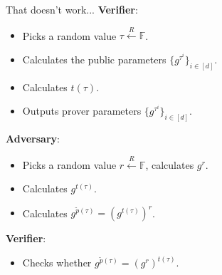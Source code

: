 \documentclass{zkdl-presentation-template}
\begin{document}
    \begin{frame}{That doesn't work...}
        \textbf{Verifier}: 
        \vspace{-5pt}
        \begin{itemize}[label=]
            \item \vspace{-3pt} Picks a random value $\tau \xleftarrow{R} \mathbb{F}$. \pause
            \item \vspace{-3pt} Calculates the public parameters $\{g^{\tau^i}\}_{i \in [d]}$. \pause
            \item \vspace{-3pt} Calculates $t(\tau)$. \pause
            \item \vspace{-3pt} Outputs prover parameters $\{g^{\tau^i}\}_{i \in [d]}$. \pause
        \end{itemize}
        \textbf{Adversary}: 
        \vspace{-5pt}
        \begin{itemize}[label=]
            \item \vspace{-3pt} Picks a random value $r \xleftarrow{R} \mathbb{F}$, calculates $g^r$. \pause
            \item \vspace{-3pt} Calculates $g^{t(\tau)}$. \pause
            \item \vspace{-3pt} Calculates $g^{\widetilde{p}(\tau)} = {\left( g^{t(\tau)} \right)}^r$. \pause
        \end{itemize}
        \textbf{Verifier}: 
        \vspace{-5pt}
        \begin{itemize}[label=]
            \item \vspace{-3pt} Checks whether $g^{\widetilde{p}(\tau)} = \left( g^{r} \right)^{t(\tau)}$.
        \end{itemize}
    \end{frame}
\end{document}

